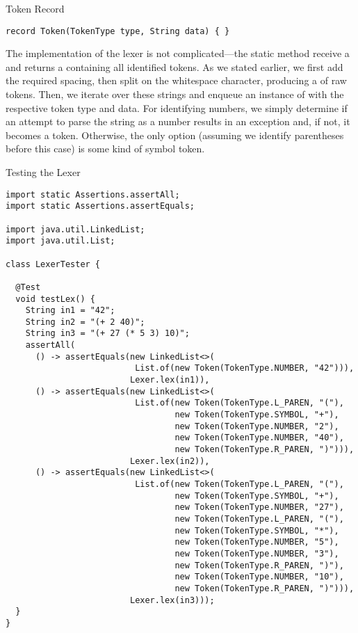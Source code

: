 \begin{cl}{Token Record}
\begin{lstlisting}[language=MyJava]
record Token(TokenType type, String data) { }
\end{lstlisting}
\end{cl}

The implementation of the lexer is not complicated---the static  method receive a  and returns a  containing all identified tokens. As we stated earlier, we first add the required spacing, then split on the whitespace character, producing a  of raw tokens. Then, we iterate over these strings and enqueue an instance of  with the respective token type and data. For identifying numbers, we simply determine if an attempt to parse the string as a number results in an exception and, if not, it becomes a  token. Otherwise, the only option (assuming we identify parentheses before this case) is some kind of symbol token.

\begin{cl}{Testing the Lexer}
\begin{lstlisting}[language=MyJava]
import static Assertions.assertAll;
import static Assertions.assertEquals;

import java.util.LinkedList;
import java.util.List;

class LexerTester {
  
  @Test
  void testLex() {
    String in1 = "42";
    String in2 = "(+ 2 40)";
    String in3 = "(+ 27 (* 5 3) 10)";
    assertAll(
      () -> assertEquals(new LinkedList<>(
                          List.of(new Token(TokenType.NUMBER, "42"))),
                         Lexer.lex(in1)),
      () -> assertEquals(new LinkedList<>(
                          List.of(new Token(TokenType.L_PAREN, "("),
                                  new Token(TokenType.SYMBOL, "+"),
                                  new Token(TokenType.NUMBER, "2"),
                                  new Token(TokenType.NUMBER, "40"),
                                  new Token(TokenType.R_PAREN, ")"))),
                         Lexer.lex(in2)),
      () -> assertEquals(new LinkedList<>(
                          List.of(new Token(TokenType.L_PAREN, "("),
                                  new Token(TokenType.SYMBOL, "+"),
                                  new Token(TokenType.NUMBER, "27"),
                                  new Token(TokenType.L_PAREN, "("),
                                  new Token(TokenType.SYMBOL, "*"),
                                  new Token(TokenType.NUMBER, "5"),
                                  new Token(TokenType.NUMBER, "3"),
                                  new Token(TokenType.R_PAREN, ")"),
                                  new Token(TokenType.NUMBER, "10"),
                                  new Token(TokenType.R_PAREN, ")"))),
                         Lexer.lex(in3)));
  }
}
\end{lstlisting}
\end{cl}

